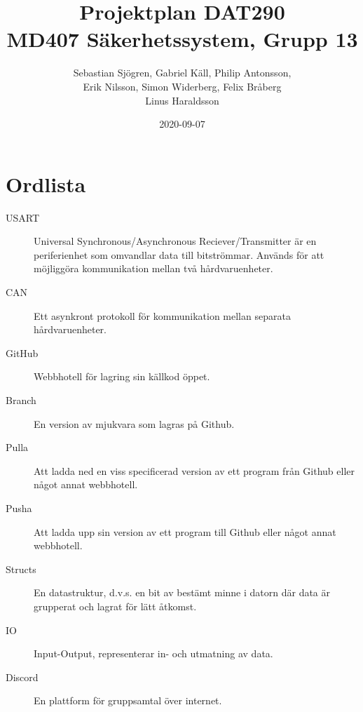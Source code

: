 \documentclass[a4paper]{article}
\begin{document}
\title{
  Projektplan DAT290 \\
  \large MD407 Säkerhetssystem, Grupp 13}
\date{2020-09-07}

\author{Sebastian Sjögren, Gabriel Käll, Philip Antonsson, \\ Erik Nilsson, Simon Widerberg, Felix Bråberg \\ Linus Haraldsson}

\maketitle
\thispagestyle{empty}
\newpage

\tableofcontents
\thispagestyle{empty}
\newpage
{}




\section*{Ordlista}
\label{sec:ordlista}
\begin{description}
    \item[USART]{Universal Synchronous/Asynchronous Reciever/Transmitter är en periferienhet som omvandlar data till bitströmmar. Används för att möjliggöra kommunikation mellan två hårdvaruenheter.}\cite{howe:2020}
    \item[CAN]{Ett asynkront protokoll för kommunikation mellan separata hårdvaruenheter.}  \cite[pg 249]{lme:2016}
    \item[GitHub]{Webbhotell för lagring sin källkod öppet.}
    \item[Branch]{En version av mjukvara som lagras på Github.}
    \item[Pulla]{Att ladda ned en viss specificerad version av ett program från Github eller något annat webbhotell.}
    \item[Pusha]{Att ladda upp sin version av ett program till Github eller något annat webbhotell.}
    \item[Structs]{En datastruktur, d.v.s. en bit av bestämt minne i datorn där data är grupperat och lagrat för lätt åtkomst.}
    \item[IO]{Input-Output, representerar in- och utmatning av data.}
    \item[Discord]{En plattform för gruppsamtal över internet.}
\end{description}
\end{document}
